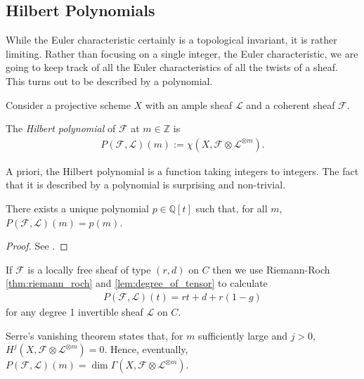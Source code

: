 \documentclass[12pt]{ociamthesis}  %
\begin{document}
\subsection{Hilbert Polynomials}

While the Euler characteristic certainly is a topological invariant,
it is rather limiting. Rather than focusing on a single integer,
the Euler characteristic,
we are going to keep track of all the Euler characteristics of all
the twists of a sheaf. This turns out to be described by a polynomial.

Consider a projective scheme $X$ with an ample sheaf $\mathscr L$
and a coherent sheaf $\mathscr F$.

\begin{definition}
  The \emph{Hilbert polynomial} of $\mathscr F$ at $m\in\mathbb{Z}$
  is
  \begin{align*}
    P(\mathscr F,\mathscr L)(m) := \chi(X,\mathscr F \otimes \mathscr L^{\otimes m}).
  \end{align*}
\end{definition}

A priori, the Hilbert polynomial is a function taking integers to
integers. The fact that it is described by a polynomial is
surprising and non-trivial.

\begin{lemma}
  There exists a unique polynomial $p\in\mathbb{Q}[t]$ such that,
  for all $m$, $P(\mathscr F,\mathscr L)(m) = p(m)$.
  \begin{proof}
    See \cite[Lemma 1.2.1]{huybrechts2010}.
  \end{proof}
\end{lemma}

\begin{example}\label{ex:hilbert_polynomial}
  If $\mathscr F$ is a locally free sheaf of type $(r,d)$
  on $C$ then we use Riemann-Roch \ref{thm:riemann_roch} and
  \ref{lem:degree_of_tensor} to calculate
  \begin{align*}
    P(\mathscr F, \mathscr L)(t) = rt + d + r(1-g)
  \end{align*}
  for any degree 1 invertible sheaf $\mathscr L$ on $C$.
\end{example}

Serre's vanishing theorem \missingcitation states that,
for $m$ sufficiently large and $j>0$,
$H^j(X,\mathscr F\otimes\mathscr L^{\otimes m})=0$. Hence,
eventually,
$P(\mathscr F,\mathscr L)(m) = \dim \Gamma(X,\mathscr F\otimes \mathscr L^{\otimes m})$.
\end{document}
